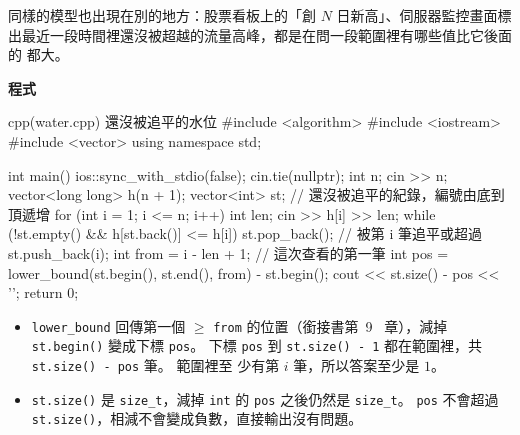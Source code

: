 同樣的模型也出現在別的地方：股票看板上的「創 $N$ 日新高」、伺服器監控畫面標
出最近一段時間裡還沒被超越的流量高峰，都是在問一段範圍裡有哪些值比它後面的
都大。

\textbf{程式}

\begin{example}[label=ex:water]{cpp}{(water.cpp) 還沒被追平的水位}
#include <algorithm>
#include <iostream>
#include <vector>
using namespace std;

int main() {
    ios::sync_with_stdio(false);
    cin.tie(nullptr);
    int n;
    cin >> n;
    vector<long long> h(n + 1);
    vector<int> st;                       // 還沒被追平的紀錄，編號由底到頂遞增
    for (int i = 1; i <= n; i++) {
        int len;
        cin >> h[i] >> len;
        while (!st.empty() && h[st.back()] <= h[i]) {
            st.pop_back();                // 被第 i 筆追平或超過
        }
        st.push_back(i);
        int from = i - len + 1;           // 這次查看的第一筆
        int pos = lower_bound(st.begin(), st.end(), from) - st.begin();
        cout << st.size() - pos << '\n';
    }
    return 0;
}
\end{example}


\begin{itemize}
\item \texttt{lower\_bound} 回傳第一個 $\ge$ \texttt{from} 的位置（銜接書第~9~
章），減掉 \texttt{st.begin()} 變成下標 \texttt{pos}。 下標 \texttt{pos} 到
\texttt{st.size() - 1} 都在範圍裡，共 \texttt{st.size() - pos} 筆。 範圍裡至
少有第 $i$ 筆，所以答案至少是 $1$。
\item \texttt{st.size()} 是 \texttt{size\_t}，減掉 \texttt{int} 的
\texttt{pos} 之後仍然是 \texttt{size\_t}。 \texttt{pos} 不會超過
\texttt{st.size()}，相減不會變成負數，直接輸出沒有問題。
\end{itemize}

